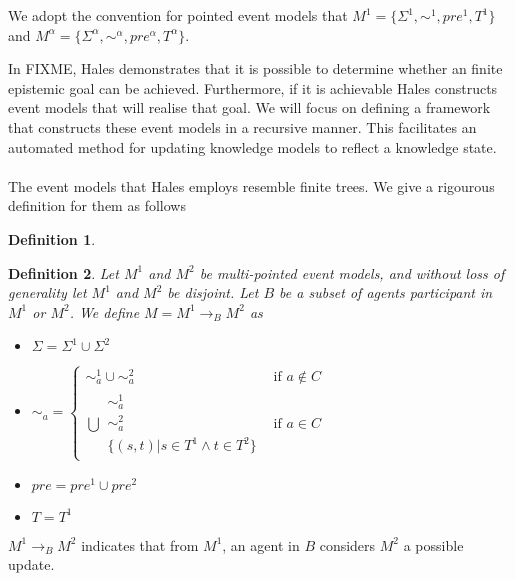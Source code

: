 \documentclass[12pt, a4paper, titlepage]{scrartcl}
\newtheorem{defn}{Definition}
\begin{document}
We adopt the convention for pointed event models that $M^1 = \{\Sigma^1, \sim^1,
pre^1, T^1\}$ and $M^\alpha = \{\Sigma^\alpha,\sim^\alpha,pre^\alpha,T^\alpha\}$.

In FIXME, Hales demonstrates that it is possible to determine whether an
finite epistemic goal can be achieved.
Furthermore, if it is achievable Hales constructs event models that will realise
that goal.
We will focus on defining a framework that constructs these event models in a
recursive manner.
This facilitates an automated method for updating knowledge models to reflect a
knowledge state.\\
\\
The event models that Hales employs resemble finite trees.
We give a rigourous definition for them as follows
\begin{defn} \label{finTree}
\end{defn}

\begin{defn} \label{possOne}
Let $M^1$ and $M^2$ be multi-pointed event models, and without loss of
generality let $M^1$ and $M^2$ be disjoint.
Let $B$ be a subset of agents participant in $M^1$ or $M^2$.
We define $M = M^1 \to_B M^2$ as 
\begin{itemize}
  \item $\Sigma = \Sigma^1 \cup \Sigma^2$
  \item $\sim_a =
  \begin{cases}
    \sim^1_a \cup \sim^2_a & \text{if } a \notin C \\
    \displaystyle\bigcup \begin{array}{c}
      \sim^1_a \\
      \sim^2_a \\
      \{(s,t) | s \in T^1 \land t \in T^2 \}
    \end{array} & \text{if } a \in C 
  \end{cases}$
  \item $pre = pre^1 \cup pre^2$
  \item $T = T^1$
\end{itemize}
\end{defn}

$M^1 \to_B M^2$ indicates that from $M^1$, an agent in $B$ considers $M^2$ a possible
update.

\end{document}
